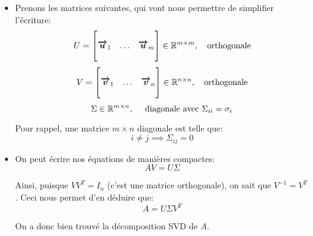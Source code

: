 \documentclass[a4paper]{article}
\begin{document}
{\begin{itemize}[left=0pt]
        \item Prenons les matrices suivantes, qui vont nous permettre de simplifier l'écriture:
              \[U = \begin{bmatrix}  &  &  \\ \bm{\protect\overrightarrow{u}}_1 & \ldots & \bm{\protect\overrightarrow{u}}_m \\  &  &  \end{bmatrix} \in \mathbb{R}^{m \times m}, \quad \text{orthogonale}\]
              \[V = \begin{bmatrix}  &  &  \\ \bm{\protect\overrightarrow{v}}_1 & \ldots & \bm{\protect\overrightarrow{v}}_n \\  &  &  \end{bmatrix} \in \mathbb{R}^{n \times n}, \quad \text{orthogonale}\]
              \[\Sigma \in \mathbb{R}^{m \times n}, \quad \text{ diagonale avec } \Sigma_{ii} = \sigma_i\]

              Pour rappel, une matrice $m \times n$ diagonale est telle que:
              \[i \neq j \implies \Sigma_{ij} = 0\]


        \item On peut écrire nos équations de manières compactes:
              \[AV = U\Sigma\]

              Ainsi, puisque $VV^T = I_n$ (c'est une matrice orthogonale), on sait que $V^{-1} = V^T$. Ceci nous permet d'en déduire que:
              \[A = U\Sigma V^T\]

              On a donc bien trouvé la décomposition SVD de $A$.
    \end{itemize}
}
\end{document}
